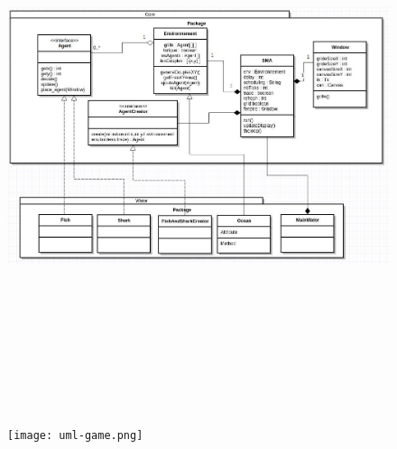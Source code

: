 \documentclass[a4paper]{article}
\begin{document}
\begin{landscape}
\begin{figure}[!h]
\includegraphics[height=16cm]{uml-wator.png}
\end{figure}
\newpage
\begin{figure}[!h]
\centering
\texttt{[image: uml-game.png]}
\end{figure}
\end{landscape}
\end{document}
